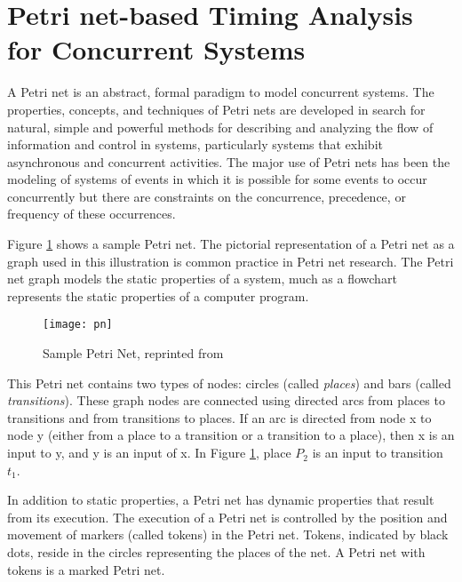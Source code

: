 
\section{Petri net-based Timing Analysis for Concurrent Systems}
\label{sec:petri_nets}

A Petri net \cite{peterson1977petri} is an abstract, formal paradigm to model concurrent systems. The properties, concepts, and techniques of Petri nets are developed in search for natural, simple and powerful methods for describing and analyzing the flow of information and control in systems, particularly systems that exhibit asynchronous and concurrent activities. The major use of Petri nets has been the modeling of systems of events in which it is possible for some events to occur concurrently but there are constraints on the concurrence, precedence, or frequency of these occurrences. 

Figure \ref{fig:pn} shows a sample Petri net. The pictorial representation of a Petri net as a graph used in this illustration is common practice in Petri net research. The Petri net graph models the static properties of a system, much as a flowchart represents the static properties of a computer program. 

\begin{figure}[h]
	\centering
	\texttt{[image: pn]}
	\caption{Sample Petri Net, reprinted from \cite{peterson1977petri}}
	\label{fig:pn}
\end{figure}

This Petri net contains two types of nodes: circles (called \emph{places}) and bars (called \emph{transitions}). These graph nodes are connected using directed arcs from places to transitions and from transitions to places. If an arc is directed from node x to node y (either from a place to a transition or a transition to a place), then x is an input to y, and y is an input of x. In Figure \ref{fig:pn}, place $P_2$ is an input to transition $t_1$. 

In addition to static properties, a Petri net has dynamic properties that result from its execution. The execution of a Petri net is controlled by the position and movement of markers (called tokens) in the Petri net. Tokens, indicated by black dots, reside in the circles representing the places of the net. A Petri net with tokens is a marked Petri net. 

